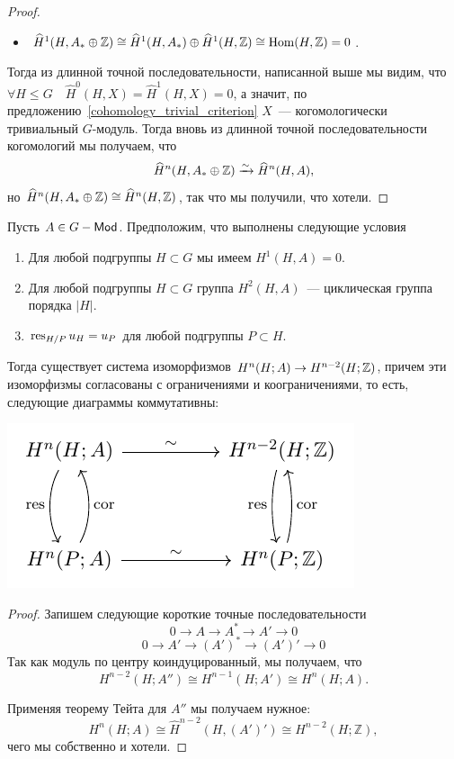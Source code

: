 \begin{proof}
\begin{itemize}
			\item $\widehat{H}^1(H, A_* \oplus \mathbb{Z}) \cong \widehat{H}^{1}(H, A_*) \oplus \widehat{H}^{1}(H, \mathbb{Z}) \cong \operatorname{Hom}(H, \mathbb{Z}) = 0$. 
		\end{itemize}

		Тогда из длинной точной последовательности, написанной выше мы видим, что $\forall H \le G \quad \widehat{H}^0(H, X) = \widehat{H}^1(H, X) = 0$, а значит, по предложению~\ref{cohomology_trivial_criterion} $X$~--- когомологически тривиальный $G$-модуль. Тогда вновь из длинной точной последовательности когомологий мы получаем, что 
		\[
			\widehat{H}^{n}(H, A_* \oplus \mathbb{Z}) \xrightarrow{\sim} \widehat{H}^n(H, A),
		\]
		но $\widehat{H}^{n}(H, A_* \oplus \mathbb{Z}) \cong \widehat{H}^{n}(H, \mathbb{Z})$, так что мы получили, что хотели. 
 	\end{proof}

 	\begin{corollary}[Тейт]
 		Пусть $A \in G-\mathsf{Mod}$. Предположим, что выполнены следующие условия 
 		\begin{enumerate}
 			\item Для любой подгруппы $H \subset G$ мы имеем $H^1(H, A) = 0$.

 			\item Для любой подгруппы $H \subset G$ группа $H^2(H, A)$~--- циклическая группа порядка $|H|$.

 			\item $\operatorname{res}_{H/P}{u_{H}} = u_{P}$ для любой подгруппы $P \subset H$. 	
 		\end{enumerate}

 		Тогда существует система изоморфизмов $H^n(H; A) \to H^{n - 2}(H; \mathbb{Z})$, причем эти изоморфизмы согласованы с ограничениями и коограничениями, то есть, следующие диаграммы коммутативны: 
 		\begin{center}
				\includegraphics[scale = 0.9]{lectures/6/pictures/cd_39.pdf}
	\end{center}

 	\end{corollary}
 	\begin{proof}
 		
 		Запишем следующие короткие точные последовательности 
 		\[
 			0 \to A \to A^* \to A' \to 0
 		\]
 		\[
 			0 \to A' \to (A')^* \to (A')' \to 0
 		\]
 		Так как модуль по центру коиндуцированный, мы получаем, что 
 		\[
 			H^{n - 2}(H; A'') \cong H^{n - 1}(H; A') \cong H^n(H; A).
 		\]

 		Применяя теорему Тейта для $A''$ мы получаем нужное:
 		\[
 			H^{n}(H; A) \cong \widehat{H}^{n - 2}(H, (A')') \cong H^{n - 2}(H; \mathbb{Z}),
 		\]
 		чего мы собственно и хотели. 
 	\end{proof}

